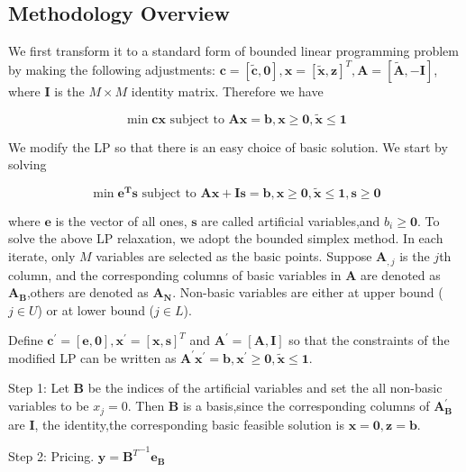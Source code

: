 \documentclass{article}
\begin{document}
\subsection{Methodology Overview}
We first transform it to a standard form of bounded linear programming problem by making the following adjustments: $\mathbf{c}=[\tilde{\mathbf{c}},\mathbf{0}],\mathbf{x}=[\tilde{\mathbf{x}},\mathbf{z}]^T,\mathbf{A}=[\tilde{\mathbf{A}},-\mathbf{I}]$, where $\mathbf{I}$ is the $M\times M$ identity matrix. Therefore we have

\begin{equation}
\min \mathbf{cx} \textrm{ subject to } \mathbf{Ax} = \mathbf{b}, \mathbf{x}\geq \mathbf{0},\tilde{\mathbf{x}} \leq \mathbf{1}
\end{equation}

We modify the LP so that there is an easy choice of basic solution. We start by solving

\begin{equation}
\min \mathbf{e^{T}s} \textrm{ subject to } \mathbf{Ax} + \mathbf{Is} = \mathbf{b}, \mathbf{x}\geq \mathbf{0},\tilde{\mathbf{x}} \leq \mathbf{1},\mathbf{s}\geq \mathbf{0}
\end{equation}

where $\mathbf{e}$ is the vector of all ones, $\mathbf{s}$ are called artificial variables,and $b_{i}\geq \mathbf{0}$.
To solve the above LP relaxation, we adopt the bounded simplex method. In each iterate, only $M$ variables are selected as the basic points. Suppose $\mathbf{A}_{,j}$ is the $j$th column, and the corresponding columns of basic variables in $\mathbf{A}$ are denoted as $\mathbf{A_B}$,others are denoted as $\mathbf{A_N}$. Non-basic variables are either at upper bound ($j \in U$) or at lower bound ($j\in L$).

Define $\mathbf{c^{'}}=[\mathbf{e},\mathbf{0}], \mathbf{x}^{'} = [\mathbf{x},\mathbf{s}]^T$ and $\mathbf{A}^{'} = [\mathbf{A},\mathbf{I}]$ so that the constraints of the modified LP can be written as $\mathbf{A}^{'}\mathbf{x}^{'} = \mathbf{b}, \mathbf{x}^{'} \geq \mathbf{0},\tilde{\mathbf{x}} \leq \mathbf{1}$.

Step 1: Let $\mathbf{B}$ be the indices of the artificial variables and set the all non-basic variables to be $x_j=0$. Then $\mathbf{B}$ is a basis,since the corresponding columns of $\mathbf{A_B^{'}}$ are $\mathbf{I}$, the identity,the corresponding basic feasible solution is $\mathbf{x} = \mathbf{0}, \mathbf{z} = \mathbf{b}$.

Step 2: Pricing. $\mathbf{y} = {\mathbf{B}^T}^{-1}\mathbf{e_B}$
\end{document}

